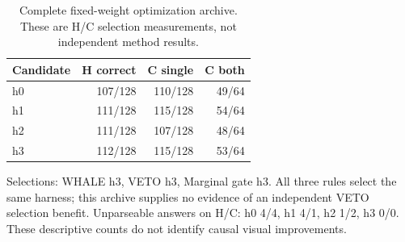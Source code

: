 \begin{table}[h]\centering\small
\begin{tabular}{lrrr}\toprule
Candidate & H correct & C single & C both\\\midrule
h0 & 107/128 & 110/128 & 49/64\\
h1 & 111/128 & 115/128 & 54/64\\
h2 & 111/128 & 107/128 & 48/64\\
h3 & 112/128 & 115/128 & 53/64\\
\bottomrule\end{tabular}
\caption{Complete fixed-weight optimization archive. These are H/C selection measurements, not independent method results.}\end{table}
Selections: WHALE h3, VETO h3, Marginal gate h3.
All three rules select the same harness; this archive supplies no evidence of an independent VETO selection benefit.
Unparseable answers on H/C: h0 4/4, h1 4/1, h2 1/2, h3 0/0. These descriptive counts do not identify causal visual improvements.
